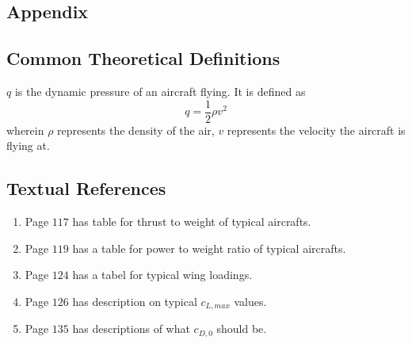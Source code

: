 \documentclass[letter, 12pt]{article}
\begin{document}
\begin{center}
\section{Appendix}
\begin{comment}
\end{comment}

\subsection{Common Theoretical Definitions}
\begin{comment}
\end{comment}
$q$ is the dynamic pressure of an aircraft flying. It is defined as
$$q = \frac{1}{2}\rho v^{2}$$
wherein $\rho$ represents the density of the air, $v$ represents the velocity the aircraft is flying at.

\subsection{Textual References}
\begin{comment}
\end{comment}
\begin{enumerate}
\item Page $117$ has table for thrust to weight of typical aircrafts.
\item Page $119$ has a table for power to weight ratio of typical aircrafts.
\item Page $124$ has a tabel for typical wing loadings.
\item Page $126$ has description on typical $c_{L,max}$ values.
\item Page $135$ has descriptions of what $c_{D,0}$ should be.
\end{enumerate}

\begin{comment}
Take-off distance is shown in this equation for a propeller (Page $130$)
$$\frac{W}{S} = T_{op} \sigma c_{L,TO}(hp/W)$$
wherein $T_{op}$ represents
$\sigma$ represents the density ratio. This is basically just the air density $\rho$ at takeoff altitude divided by sea-level density
$c_{L,TO}$ represents the take-off lift coefficient. This is the maximum lift coefficient divided by $1.21 = 1.1^{2}$. This is because the aircraft takes off at around $1.1$ of its stall speed.
$hp$ represents 
$W$ represents take-off weight of the aircraft
\end{comment}


\end{center}
\end{document}
